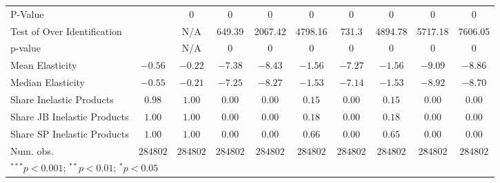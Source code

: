 \begin{tabular}{l c c c c c c c c c}
P-Value                     &               & 0             & 0             & 0             & 0             & 0             & 0             & 0             & 0             \\
Test of Over Identification &               & N/A           & 649.39        & 2067.42       & 4798.16       & 731.3         & 4894.78       & 5717.18       & 7606.05       \\
p-value                     &               & N/A           & 0             & 0             & 0             & 0             & 0             & 0             & 0             \\
Mean Elasticity             & $-0.56$       & $-0.22$       & $-7.38$       & $-8.43$       & $-1.56$       & $-7.27$       & $-1.56$       & $-9.09$       & $-8.86$       \\
Median Elasticity           & $-0.55$       & $-0.21$       & $-7.25$       & $-8.27$       & $-1.53$       & $-7.14$       & $-1.53$       & $-8.92$       & $-8.70$       \\
Share Inelastic Products    & $0.98$        & $1.00$        & $0.00$        & $0.00$        & $0.15$        & $0.00$        & $0.15$        & $0.00$        & $0.00$        \\
Share JB Inelastic Products & $1.00$        & $1.00$        & $0.00$        & $0.00$        & $0.18$        & $0.00$        & $0.18$        & $0.00$        & $0.00$        \\
Share SP Inelastic Products & $1.00$        & $1.00$        & $0.00$        & $0.00$        & $0.66$        & $0.00$        & $0.65$        & $0.00$        & $0.00$        \\
Num. obs.                   & $284802$      & $284802$      & $284802$      & $284802$      & $284802$      & $284802$      & $284802$      & $284802$      & $284802$      \\
\bottomrule
\multicolumn{10}{l}{\scriptsize{$^{***}p<0.001$; $^{**}p<0.01$; $^{*}p<0.05$}}
\end{tabular}
